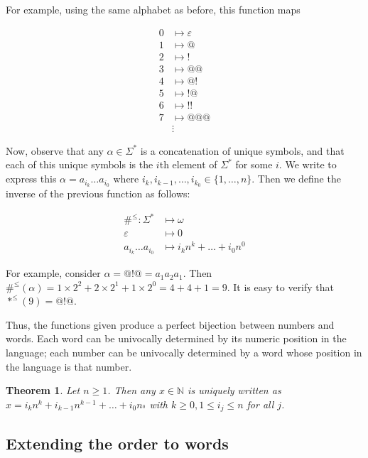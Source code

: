 \documentclass[a4paper, 12pt]{article}
\newtheorem{theorem}{Theorem}
\newtheorem{theorem}{Theorem}
\begin{document}
For example, using the same alphabet as before, this function maps 

\begin{align*}
    0 &\mapsto \varepsilon \\ 
    1 &\mapsto @ \\ 
    2 &\mapsto ! \\ 
    3 &\mapsto @@ \\ 
    4 &\mapsto @! \\ 
    5 &\mapsto !@ \\ 
    6 &\mapsto  !! \\ 
    7 &\mapsto  @@@ \\ 
      &\vdots
\end{align*}

Now, observe that any $\alpha \in \Sigma^{*}$ is a concatenation of unique
symbols, and that each of this unique symbols is the $i$th element of
$\Sigma^{*}$ for some $i$. We write to express this $\alpha = a_{i_k}\ldots
a_{i_0}$ where $i_{k}, i_{k-1}, \ldots, i_{k_0} \in \{ 1, \ldots, n\}$. Then we
define the inverse of the previous function as follows: 

\begin{align*}
    \#^{\leq} : \Sigma^{*} &\mapsto \omega \\ 
    \varepsilon & \mapsto 0 \\ 
    a_{i_k} \ldots a_{i_0} &\mapsto i_k n^{k} + \ldots + i_0 n^0
\end{align*}

For example, consider $\alpha = @!@ = a_{1} a_2 a_1$. Then $\#^{\leq}( \alpha )
= 1 \times 2^2 + 2 \times 2^1 + 1 \times 2^0 = 4 + 4 + 1 = 9$. It is easy to
verify that $*^{\leq}( 9 ) = @!@$.

Thus, the functions given produce a perfect bijection between numbers and words.
Each word can be univocally determined by its numeric position in the language;
each number can be univocally determined by a word whose position in the
language is that number. 

\begin{theorem}
    Let $n \geq 1$. Then any $x \in \mathbb{N}$ is uniquely written as $x = i_k
    n^k + i_{k-1} n^{k-1} + \ldots + i_0 n_^0$ with $k \geq 0, 1 \leq i_j \leq
    n$ for all $j$.
\end{theorem}

\subsection{Extending the order to words}
\end{document}
